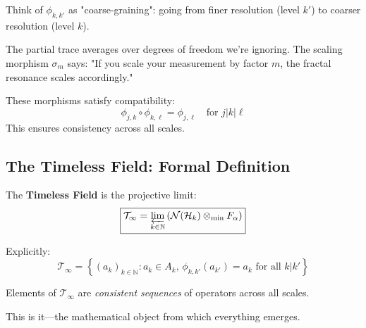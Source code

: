 \begin{defn}
\begin{intuitive}
Think of $\phi_{k,k'}$ as "coarse-graining": going from finer resolution (level $k'$) to coarser resolution (level $k$).

The partial trace averages over degrees of freedom we're ignoring. The scaling morphism $\sigma_m$ says: "If you scale your measurement by factor $m$, the fractal resonance scales accordingly."

These morphisms satisfy compatibility:
\begin{equation}
\phi_{j,k} \circ \phi_{k,\ell} = \phi_{j,\ell} \quad \text{for } j|k|\ell
\end{equation}
This ensures consistency across all scales.
\end{intuitive}

\subsection{The Timeless Field: Formal Definition}

\begin{defn}\label{def:timeless-field}
The \textbf{Timeless Field} is the projective limit:
\begin{equation}
\boxed{\mathcal{T}_\infty = \varprojlim_{k \in \mathbb{N}} \left(\mathcal{N}(\mathcal{H}_k) \otimes_{\min} F_\alpha\right)}
\end{equation}

Explicitly:
\begin{equation}
\mathcal{T}_\infty = \left\{(a_k)_{k \in \mathbb{N}} : a_k \in A_k, \, \phi_{k,k'}(a_{k'}) = a_k \text{ for all } k|k'\right\}
\end{equation}

Elements of $\mathcal{T}_\infty$ are \textit{consistent sequences} of operators across all scales.
\end{defn}

This is it—the mathematical object from which everything emerges.

\begin{figure}[h]
\centering
{}
\end{figure}
\end{defn}

